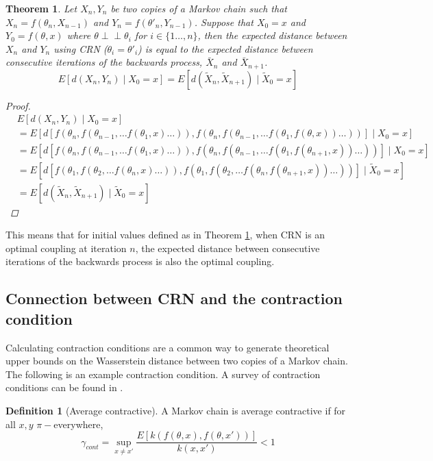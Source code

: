 \documentclass[12pt]{article}
\theoremstyle{plain}%
\newtheorem{theorem}{Theorem}[section]
\theoremstyle{definition}
\newtheorem{definition}{Definition}[section]
\newcommand{\indep}{\perp \!\!\! \perp}
\begin{document}
	\begin{theorem}\label{thm:backwards}
		Let $X_n,Y_n$ be two copies of a Markov chain such that $X_n=f(\theta_n, X_{n-1})$ and $Y_n=f(\theta'_n, Y_{n-1})$. Suppose that $X_0=x$ and $Y_0=f(\theta,x)$ where $\theta\indep \theta_i$ for $i\in\{1\ldots, n\}$, then the expected distance between $X_n$ and $Y_n$ using CRN ($\theta_i=\theta'_i$) is equal to the expected distance between consecutive iterations of the backwards process, $\bar{X}_n$ and $\bar{X}_{n+1}$.
		$$E[d(X_n,Y_{n})\mid X_0=x]=E[d(\tilde{X}_n,\tilde{X}_{n+1})\mid \tilde{X}_0 = x]$$ 
		\begin{proof}
			\begin{align*}
				&E[d(X_n,Y_{n})\mid X_0=x] \\
				&=E[d[f(\theta_n,f(\theta_{n-1},\ldots f(\theta_1,x)\ldots)),f(\theta_n,f(\theta_{n-1},\ldots f(\theta_1,f(\theta,x))\ldots))]\mid X_0=x]\\
				&=E[d[f(\theta_n,f(\theta_{n-1},\ldots f(\theta_1,x)\ldots)),f(\theta_n,f(\theta_{n-1},\ldots f(\theta_1,f(\theta_{n+1},x))\ldots))]\mid X_0=x]\\
				&=E[d[f(\theta_1,f(\theta_{2},\ldots f(\theta_n,x)\ldots)),f(\theta_1,f(\theta_{2},\ldots f(\theta_n,f(\theta_{n+1},x))\ldots))]\mid \tilde{X}_0=x]\\
				&= E[d(\tilde{X}_n,\tilde{X}_{n+1})\mid \tilde{X}_0 = x]
			\end{align*}
		\end{proof}
	\end{theorem}
	
	This means that for initial values defined as in Theorem \ref{thm:backwards}, when CRN is an optimal coupling at iteration $n$, the expected distance between consecutive iterations of the backwards process is also the optimal coupling. 

	\subsection{Connection between CRN and the contraction condition}\label{subsec:contractioncond}
	Calculating contraction conditions are a common way to generate theoretical upper bounds on the Wasserstein distance between two copies of a Markov chain. The following is an example contraction condition. A survey of contraction conditions can be found in \cite{avcont}.
	
	\begin{definition}[Average contractive]
		A Markov chain is average contractive if for all $x,y$ $\pi-$everywhere,
		$$\gamma_{cont}=\sup_{x \not= x'} \frac{E[k(f(\theta, x),f(\theta, x'))]}{k(x,x')}<1$$
	\end{definition}
	
\end{document}
